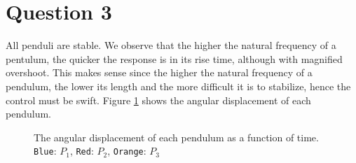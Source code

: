\section{Question 3}

All penduli are stable. We observe that the higher the natural frequency of a
pentulum, the quicker the response is in its rise time, although with magnified
overshoot. This makes sense since the higher the natural frequency of a
pendulum, the lower its length and the more difficult it is to stabilize, hence
the control must be swift. Figure \ref{fig:3} shows the angular displacement
of each pendulum.

\begin{figure}[H]\centering
  \scalebox{1}{}
  \caption{The angular displacement of each pendulum as a function of time.
    \texttt{Blue}: $P_1$, \texttt{Red}: $P_2$, \texttt{Orange}: $P_3$}
  \label{fig:3}
\end{figure}
